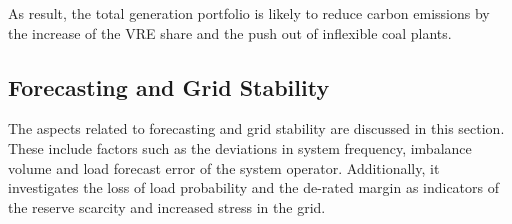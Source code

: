 \documentclass[energies,article,submit,moreauthors,pdftex]{Definitions/mdpi}
\begin{document}
As result, the total generation portfolio is likely to reduce carbon emissions by the increase of the VRE share and the push out of inflexible coal plants.



\subsection{Forecasting and Grid Stability}
The aspects related to forecasting and grid stability are discussed in this section. These include factors such as the deviations in system frequency, imbalance volume and load forecast error of the system operator. Additionally, it investigates the loss of load probability and the de-rated margin as indicators of the reserve scarcity and increased stress in the grid.
\end{document}
